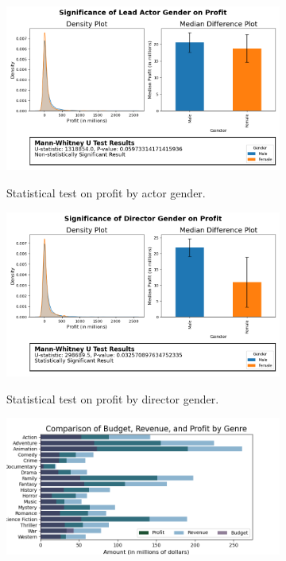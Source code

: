 \documentclass[12pt]{article}
\begin{document}
\begin{figure}[H]
\begin{subfigure}[b]{0.33\textwidth}
\centering
\includegraphics[width=1\textwidth]{images/george_viz/test_actor_gender.png}
\label{fig:sub1}
\caption{Statistical test on profit by actor gender.}
\end{subfigure}
\hfill
\begin{subfigure}[b]{0.33\textwidth}
\centering
\includegraphics[width=1\textwidth]{images/george_viz/test_director_gender.png}
\label{fig:sub1}
\caption{Statistical test on profit by director gender.}
\end{subfigure}
\hfill
\begin{subfigure}[b]{0.32\textwidth}
\centering
\includegraphics[width=1\textwidth]{images/george_viz/genres_budget_revenue_profit.png}

\end{subfigure}
\end{figure}
\end{document}
